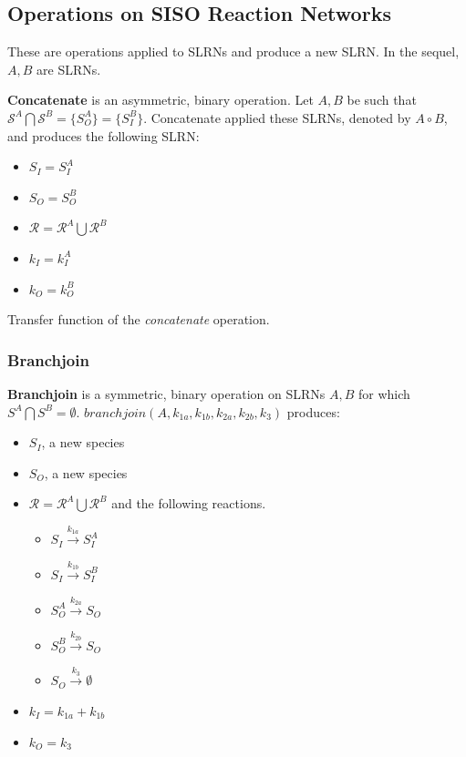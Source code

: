 \documentclass[unnumsec,webpdf,contemporary,large]{oup-authoring-template}%
\theoremstyle{thmstyleone}%
\theoremstyle{thmstyletwo}%
\theoremstyle{thmstylethree}%
\begin{document}
\subsection{Operations on SISO Reaction Networks}
These are operations applied to SLRNs and produce a new SLRN.
In the sequel, $A, B$ are SLRNs.

{\bf Concatenate} is an asymmetric, binary operation.
Let $A, B$ be such that $\mathcal{S}^A \bigcap \mathcal{S}^B =
\{ S^A_O \} = \{ S^B_I \}$. 
Concatenate applied these SLRNs, denoted by $A \circ  B$,
and produces
the following SLRN:
\begin{itemize}
\item $S_I =S^A_I$
\item $S_O = S^B_O$
\item $\mathcal{R} = \mathcal{R}^A \bigcup \mathcal{R}^B$
\item $k_I = k^A_I$
\item $k_O = k^B_O$
\end{itemize}

Transfer function of the {\em concatenate} operation.

\subsubsection{Branchjoin}
{\bf Branchjoin} is a symmetric, binary operation on SLRNs $A, B$ for which
$S^A \bigcap S^B = \emptyset$.
$branchjoin(A, k_{1a}, k_{1b}, k_{2a}, k_{2b}, k_3)$
produces:
\begin{itemize}
\item $S_I$, a new species
\item $S_O$, a new species
\item $\mathcal{R} = \mathcal{R}^A \bigcup \mathcal{R}^B$ and the following reactions.
\begin{itemize}
\item
$S_I \xrightarrow{k_{1a}} S^A_I$
\item $S_I \xrightarrow{k_{1b}} S^B_I$
\item
$S^A_O \xrightarrow{k_{2a}} S_O$
\item
$S^B_O \xrightarrow{k_{2b}} S_O$
\item
$S_O \xrightarrow{k_3} \emptyset$
\end{itemize}
\item $k_I = k_{1a} + k_{1b}$
\item $k_O = k_3$
\end{itemize}
\end{document}
